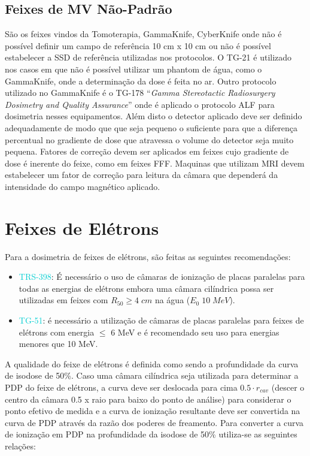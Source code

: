 \documentclass[11pt,a4paper]{article}
\begin{document}
	\subsection{Feixes de MV Não-Padrão}

		São os feixes vindos da Tomoterapia, GammaKnife, CyberKnife onde não é possível definir um campo de referência 10 cm x 10 cm ou não é possível estabelecer a SSD de referência utilizadas nos protocolos. O TG-21 é utilizado nos casos em que não é possível utilizar um phantom de água, como o GammaKnife, onde a determinação da dose é feita no ar. Outro protocolo utilizado no GammaKnife é o TG-178 ``\textit{Gamma Stereotactic Radiosurgery Dosimetry and Quality Assurance}'' onde é aplicado o protocolo ALF para dosimetria nesses equipamentos. Além disto o detector aplicado deve ser definido adequadamente de modo que que seja pequeno o suficiente para que a diferença percentual no gradiente de dose que atravessa o volume do detector seja muito pequena. Fatores de correção devem ser aplicados em feixes cujo gradiente de dose é inerente do feixe, como em feixes FFF. Maquinas que utilizam MRI devem estabelecer um fator de correção para leitura da câmara que dependerá da intensidade do campo magnético aplicado.
	

	\section{Feixes de Elétrons}

	Para a dosimetria de feixes de elétrons, são feitas as seguintes recomendações:

		\begin{itemize}
			\item \textcolor{DarkTurquoise}{TRS-398}: É necessário o uso de câmaras de ionização de placas paralelas para todas as energias de elétrons embora uma câmara cilíndrica possa ser utilizadas em feixes com $R_{50} \geq 4\;cm$ na água ($E_0 \; 10\; MeV$). 
			\item \textcolor{DarkTurquoise}{TG-51}: é necessário a utilização de câmaras de placas paralelas para feixes de elétrons com energia $\leq$ 6 MeV e é recomendado seu uso para energias menores que 10 MeV.
		\end{itemize}

	A qualidade do feixe de elétrons é definida como sendo a profundidade da curva de isodose de 50\%. Caso uma câmara cilíndrica seja utilizada para determinar a PDP do feixe de elétrons, a curva deve ser deslocada para cima $0.5\cdot r_{cav}$ (descer o centro da câmara 0.5 x raio para baixo do ponto de análise) para considerar o ponto efetivo de medida e a curva de ionização resultante deve ser convertida na curva de PDP através da razão dos poderes de freamento. Para converter a curva de ionização em PDP na profundidade da isodose de 50\% utiliza-se as seguintes relações:
\end{document}
